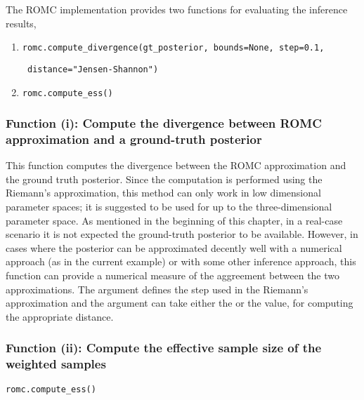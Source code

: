 The ROMC implementation provides two functions for evaluating the inference results,

\begin{enumerate}[label=(\roman*)]
\item \texttt{romc.compute_divergence(gt_posterior, bounds=None, step=0.1,}

      \texttt{                        distance="Jensen-Shannon")}

\item \texttt{romc.compute_ess()}
\end{enumerate}

\subsubsection*{Function (i): Compute the divergence between ROMC approximation and a ground-truth posterior}


\vspace{5mm}

\noindent
This function computes the divergence between the ROMC approximation
and the ground truth posterior. Since the computation is performed
using the Riemann's approximation, this method can only work in low
dimensional parameter spaces; it is suggested to be used for up to the
three-dimensional parameter space. As mentioned in the beginning of
this chapter, in a real-case scenario it is not expected the
ground-truth posterior to be available. However, in cases where the
posterior can be approximated decently well with a numerical approach
(as in the current example) or with some other inference approach,
this function can provide a numerical measure of the aggreement
between the two approximations. The argument  defines
the step used in the Riemann's approximation and the argument
 can take either the  or the
 value, for computing the appropriate distance.

\subsubsection*{Function (ii): Compute the effective sample size of the weighted samples}

\texttt{romc.compute_ess()}
\vspace{5mm}

